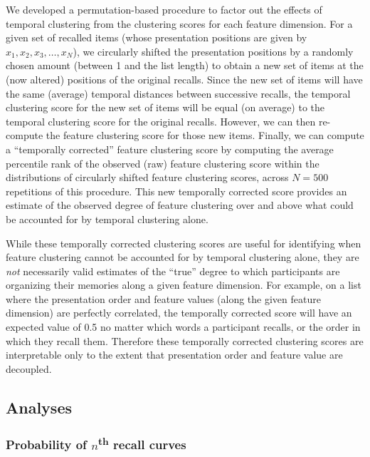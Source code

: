 \documentclass[11pt]{article}
\begin{document}
We developed a permutation-based procedure to factor out the effects of
temporal clustering from the clustering scores for each feature dimension. For
a given set of recalled items (whose presentation positions are given by $x_1,
x_2, x_3, …, x_N$), we circularly shifted the presentation positions by a
randomly chosen amount (between 1 and the list length) to obtain a new set of
items at the (now altered) positions of the original recalls. Since the new
set of items will have the same (average) temporal distances between successive
recalls, the temporal clustering score for the new set of items will be equal (on
average) to the temporal clustering score for the original recalls. However, we
can then re-compute the feature clustering score for those new items. Finally,
we can compute a ``temporally corrected'' feature clustering score by computing
the average percentile rank of the observed (raw) feature clustering score
within the distributions of circularly shifted feature clustering scores,
across $N = 500$ repetitions of this procedure. This new temporally corrected
score provides an estimate of the observed degree of feature clustering over
and above what could be accounted for by temporal clustering alone.

While these temporally corrected clustering scores are useful for identifying
when feature clustering cannot be accounted for by temporal clustering alone,
they are \textit{not} necessarily valid estimates of the ``true'' degree to
which participants are organizing their memories along a given feature
dimension. For example, on a list where the presentation order and feature
values (along the given feature dimension) are perfectly correlated, the
temporally corrected score will have an expected value of 0.5 no matter which
words a participant recalls, or the order in which they recall them. Therefore these temporally corrected
clustering scores are interpretable only to the extent that presentation order
and feature value are decoupled.

\subsection*{Analyses}

\subsubsection*{Probability of $n$\textsuperscript{th} recall curves}
\end{document}
